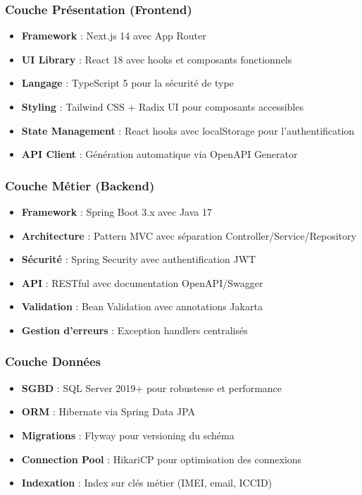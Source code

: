 \documentclass[12pt,a4paper]{report}
\begin{document}
\subsubsection{Couche Présentation (Frontend)}
\begin{itemize}
\item \textbf{Framework} : Next.js 14 avec App Router
\item \textbf{UI Library} : React 18 avec hooks et composants fonctionnels
\item \textbf{Langage} : TypeScript 5 pour la sécurité de type
\item \textbf{Styling} : Tailwind CSS + Radix UI pour composants accessibles
\item \textbf{State Management} : React hooks avec localStorage pour l'authentification
\item \textbf{API Client} : Génération automatique via OpenAPI Generator
\end{itemize}

\subsubsection{Couche Métier (Backend)}
\begin{itemize}
\item \textbf{Framework} : Spring Boot 3.x avec Java 17
\item \textbf{Architecture} : Pattern MVC avec séparation Controller/Service/Repository
\item \textbf{Sécurité} : Spring Security avec authentification JWT
\item \textbf{API} : RESTful avec documentation OpenAPI/Swagger
\item \textbf{Validation} : Bean Validation avec annotations Jakarta
\item \textbf{Gestion d'erreurs} : Exception handlers centralisés
\end{itemize}

\subsubsection{Couche Données}
\begin{itemize}
\item \textbf{SGBD} : SQL Server 2019+ pour robustesse et performance
\item \textbf{ORM} : Hibernate via Spring Data JPA
\item \textbf{Migrations} : Flyway pour versioning du schéma
\item \textbf{Connection Pool} : HikariCP pour optimisation des connexions
\item \textbf{Indexation} : Index sur clés métier (IMEI, email, ICCID)
\end{itemize}
\end{document}
